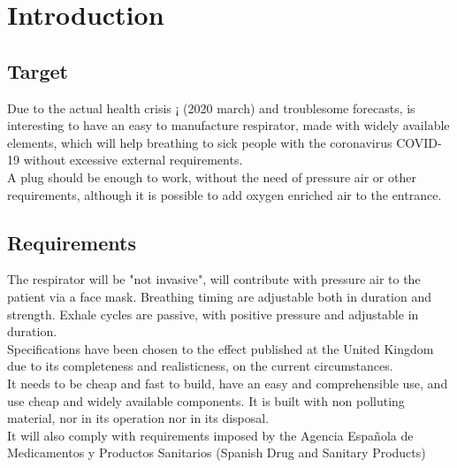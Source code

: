 \section{Introduction}
\subsection{Target}
    Due to the actual health crisis ¡ (2020 march) and troublesome forecasts, is interesting to have an easy to manufacture respirator, made with widely available elements, which will help breathing to sick people with the coronavirus COVID-19 without excessive external requirements.\\
    
    A plug should be enough to work, without the need of pressure air or other requirements, although it is possible to add oxygen enriched air to the entrance.
    
\subsection{Requirements}
    The respirator will be "not invasive", will contribute with pressure air to the patient via a face mask. Breathing timing are adjustable both in duration and strength. Exhale cycles are passive, with positive pressure and adjustable in duration.\\
    
    Specifications have been chosen to the effect published at the United Kingdom \cite{MHRA} due to its completeness and realisticness, on the current circumstances.\\
    
    It needs to be cheap and fast to build, have an easy and comprehensible use, and use cheap and widely available components. It is built with non polluting material, nor in its operation nor in its disposal.\\
    
    It will also comply with requirements imposed by the Agencia Española de Medicamentos y Productos Sanitarios (Spanish Drug and Sanitary Products)
    